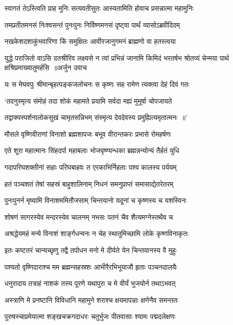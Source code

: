 \twolineshloka
{स्वागतं तेऽस्त्विति प्राह मुनिः सत्यवतीसुतः}
{आस्यतामिति होवाच प्रसन्नात्मा महामुनिः}


\twolineshloka
{तमप्रतीतमनसं निःश्वसन्तं पुनःपुनः}
{निर्विष्णमनसं दृष्ट्वा पार्थं व्यासोऽब्रवीदिदम्}


\twolineshloka
{नखकेशदशाकुंभवारिणा किं समुक्षितः}
{आवीरजानुगमनं ब्राह्मणो वा हतस्त्वया}


\fourlineindentedshloka
{युद्धे पराजितो वाऽसि दतश्रीरिव लक्ष्यसे}
{न त्वां प्रभिन्नं जानामि किमिदं भरतर्षभ}
{श्रोतव्यं चेन्मया पार्थ क्षश्रिप्रमाख्यातुमर्हसि ॥अर्जुन उवाच}
{}


\twolineshloka
{यः स मेघवपुः श्रीमान्बृहत्पङ्कजलोचनः}
{स कृष्णः सह रामेण त्यक्त्वा देहं दिवं गतः}


\twolineshloka
{`तदनुस्मृत्य संमोहं तदा शोकं महामते}
{प्रयामि सर्वदा मह्यं मुमूर्षा चोपजायते}


\twolineshloka
{तद्वाक्यस्पर्शनालोकसुखं चामृतसन्निभम्}
{संस्मृत्य देवदेवस्य प्रमुह्यित्यमृतात्मनः ॥'}


\twolineshloka
{मौसले वृष्णिवीराणां विनाशो ब्रह्मशापजः}
{बभूव वीरान्तकरः प्रभासे रोमहर्षणः}


\twolineshloka
{एते शूरा महात्मानः सिंहदर्पा महाबलाः}
{भोजवृष्ण्यन्धका ब्रह्मन्नन्योन्यं तैर्हतं युधि}


\twolineshloka
{गदापरिघशक्तीनां सहाः परिघबाहवः}
{त एरकाभिर्निहताः पश्य कालस्य पर्ययम्}


\twolineshloka
{हतं पञ्चशतं तेषां सहस्रं बाहुशालिनाम्}
{निधनं समनुप्राप्तं समासाद्येतरेतरम्}


\twolineshloka
{पुनःपुनर्न मृष्यामि विनाशममितौजसाम्}
{चिन्तयानो यदूनां च कृष्णस्य च यशस्विनः}


\twolineshloka
{शोषणं सागरस्येव मन्दरस्येव चालनम्}
{नभसः पतनं चैव शैत्यमग्नेस्तथैव च}


\twolineshloka
{अश्रद्धेयमहं मन्ये विनाशं शार्ङ्गधन्वनः}
{न चेह स्थातुमिच्छामि लोके कृष्णविनाकृतः}


\twolineshloka
{इतः कष्टतरं चान्यच्छृणु तद्वै तपोधन}
{मनो मे दीर्यते येन चिन्तयानस्य वै मुहुः}


\twolineshloka
{पश्यतो वृष्णिदाराश्च मम ब्रह्मन्सहस्रशः}
{आभीरैरभिभूयाजौ हृताः पञ्चनदालयैः}


\twolineshloka
{धनुरादाय तत्राहं नाशकं तस्य पूरणे}
{यथापुरा च मे वीर्यं भुजयोर्न तथाऽभवत्}


\twolineshloka
{अस्त्राणि मे प्रनष्टानि विविधानि महामुने}
{शराश्च क्षयमापन्नाः क्षणेनैव समन्ततः}


\twolineshloka
{पुरुषस्चाप्रमेयात्मा शङ्खचक्रगदाधरः}
{चतुर्भुजः पीतवासाः श्यामः पद्मदलेक्षणः}


